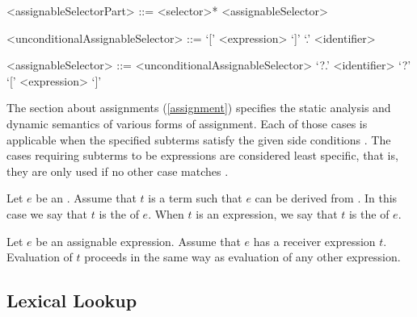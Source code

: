 \documentclass[makeidx]{article}
\begin{document}
{\begin{grammar}
<assignableSelectorPart> ::= <selector>* <assignableSelector>

<unconditionalAssignableSelector> ::= `[' <expression> `]'
  \alt `.' <identifier>

<assignableSelector> ::= <unconditionalAssignableSelector>
  \alt `?.' <identifier>
  \alt `?' `[' <expression> `]'

\end{grammar}

\LMHash{}%
The section about assignments
(\ref{assignment})
specifies the static analysis and dynamic semantics of
various forms of assignment.
Each of those cases is applicable when the specified subterms satisfy
the given side conditions
.
The cases requiring subterms to be expressions are considered least specific,
that is, they are only used if no other case matches
.


\LMHash{}%
%
Let $e$ be an .
Assume that $t$ is a term such that $e$ can be derived from
.
In this case we say that $t$ is the
of $e$.
When $t$ is an expression, we say that $t$ is the
of $e$.


\LMHash{}%
Let $e$ be an assignable expression.
Assume that $e$ has a receiver expression $t$.
Evaluation of $t$ proceeds in the same way as
evaluation of any other expression.


\subsection{Lexical Lookup}

}
\end{document}
